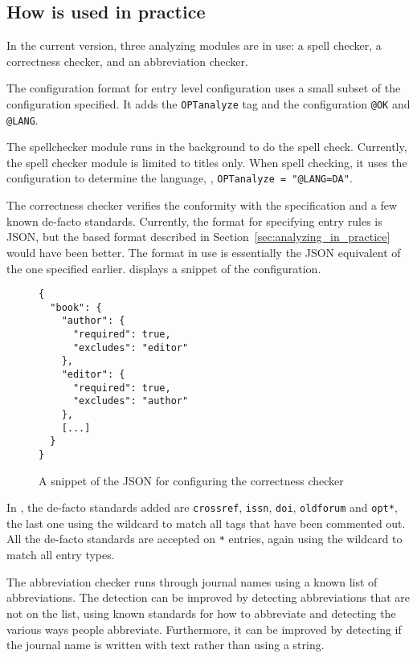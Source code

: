 \subsection{How {\orangutan} is used in practice}

In the current version, three analyzing modules are in use: a spell
checker, a correctness checker, and an abbreviation checker.

The configuration format for entry level configuration uses a small
subset of the configuration specified.  It adds the
\texttt{OPTanalyze} tag and the configuration \texttt{@OK} and
\texttt{@LANG}.

The spellchecker module runs  in the background to do
the spell check.  Currently, the spell checker module is limited to
titles only.  When spell checking, it uses the configuration to
determine the language, \eg, \texttt{OPTanalyze = "@LANG=DA"}.

The correctness checker verifies the conformity with the {\bibtex}
specification and a few known de-facto standards.  Currently, the
format for specifying entry rules is JSON, but the {\bibtex} based
format described in Section~\ref{sec:analyzing_in_practice} would have
been better.  The format in use is essentially the JSON equivalent of
the one specified earlier.  
displays a snippet of the configuration.

\begin{figure}
  \centering
\begin{verbatim}
{
  "book": {
    "author": {
      "required": true,
      "excludes": "editor"
    },
    "editor": {
      "required": true,
      "excludes": "author"
    },
    [...]
  }
}
\end{verbatim}
\caption{A snippet of the JSON for configuring the correctness checker}
\label{fig:correctness_checker_json}
\end{figure}

In {\orangutan}, the de-facto standards added are \texttt{crossref},
\texttt{issn}, \texttt{doi}, \texttt{oldforum} and \texttt{opt*}, the
last one using the wildcard to match all tags that have been commented
out.  All the de-facto standards are accepted on \texttt{*} entries,
again using the wildcard to match all entry types.

The abbreviation checker runs through journal names using a known list
of abbreviations.  The detection can be improved by detecting
abbreviations that are not on the list, using known standards for how
to abbreviate and detecting the various ways people abbreviate.
Furthermore, it can be improved by detecting if the journal name is
written with text rather than using a {\bibtex} string.


